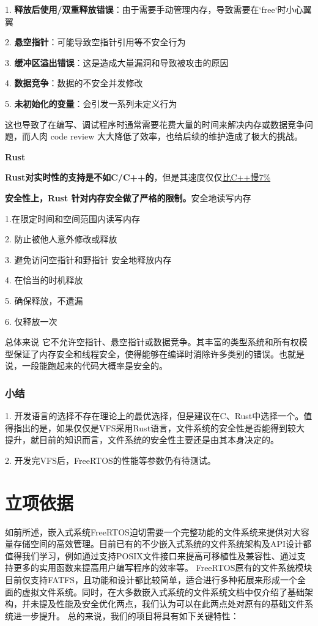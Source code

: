 \documentclass[UTF8,a4paper]{ctexart}
\begin{document}
	1.   \textbf{释放后使用/双重释放错误}：由于需要手动管理内存，导致需要在`free`时小心翼翼
	
	2. \textbf{悬空指针}：可能导致空指针引用等不安全行为
	
	3.  \textbf{缓冲区溢出错误}：这是造成大量漏洞和导致被攻击的原因
	
	4.  \textbf{数据竞争}：数据的不安全并发修改
	
	5.  \textbf{未初始化的变量}：会引发一系列未定义行为
	
	这也导致了在编写、调试程序时通常需要花费大量的时间来解决内存或数据竞争问题，而人肉 code review 大大降低了效率，也给后续的维护造成了极大的挑战。
	
	\textbf{Rust}
	
	\textbf{Rust对实时性的支持是不如C/C++的}，但是其速度仅仅\href{https://blog.famzah.net/2016/09/10/cpp-vs-python-vs-php-vs-java-vs-others-performance-benchmark-2016-q3/}{比C++慢7\%}
	
	\textbf{安全性上，Rust 针对内存安全做了严格的限制。}安全地读写内存 
	
	1.在限定时间和空间范围内读写内存
	
	2. 防止被他人意外修改或释放
	
	3. 避免访问空指针和野指针 安全地释放内存
	
	4. 在恰当的时机释放
	
	5. 确保释放，不遗漏
	
	6. 仅释放一次 
	
	总体来说 它不允许空指针、悬空指针或数据竞争。其丰富的类型系统和所有权模型保证了内存安全和线程安全，使得能够在编译时消除许多类别的错误。也就是说，一段能跑起来的代码大概率是安全的。
	\subsubsection{小结}
	1. 开发语言的选择不存在理论上的最优选择，但是建议在C、Rust中选择一个。值得指出的是，如果仅仅是VFS采用Rust语言，文件系统的安全性是否能得到较大提升，就目前的知识而言，文件系统的安全性主要还是由其本身决定的。
	
	2. 开发完VFS后，FreeRTOS的性能等参数仍有待测试。

\section{立项依据}
如前所述，嵌入式系统FreeRTOS迫切需要一个完整功能的文件系统来提供对大容量存储空间的高效管理。目前已有的不少嵌入式系统的文件系统架构及API设计都值得我们学习，例如通过支持POSIX文件接口来提高可移植性及兼容性、通过支持更多的实用函数来提高用户编写程序的效率等。
FreeRTOS原有的文件系统模块目前仅支持FATFS，且功能和设计都比较简单，适合进行多种拓展来形成一个全面的虚拟文件系统。同时，在大多数嵌入式系统的文件系统文档中仅介绍了基础架构，并未提及性能及安全优化两点，我们认为可以在此两点处对原有的基础文件系统进一步提升。
总的来说，我们的项目将具有如下关键特性：
\end{document}

